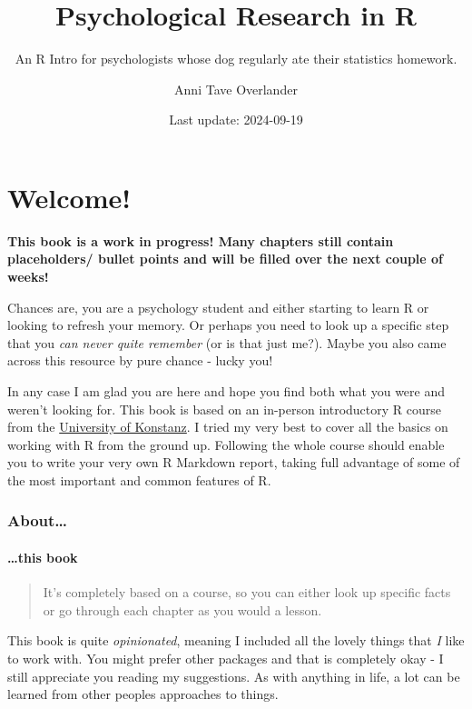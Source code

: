 \documentclass[
]{book}
\title{Psychological Research in R}
\subtitle{An R Intro for psychologists whose dog regularly ate their statistics homework.}
\author{Anni Tave Overlander}
\date{Last update: 2024-09-19}
\begin{document}
\maketitle

{
\setcounter{tocdepth}{1}
\tableofcontents
}
\chapter*{Welcome!}\label{welcome}

\textbf{This book is a work in progress! Many chapters still contain placeholders/ bullet points and will be filled over the next couple of weeks!}

Chances are, you are a psychology student and either starting to learn R or looking to refresh your memory.
Or perhaps you need to look up a specific step that you \emph{can never quite remember} (or is that just me?).
Maybe you also came across this resource by pure chance - lucky you!

In any case I am glad you are here and hope you find both what you were and weren't looking for.
This book is based on an in-person introductory R course from the \href{https://www.uni-konstanz.de/}{University of Konstanz}.
I tried my very best to cover all the basics on working with R from the ground up.
Following the whole course should enable you to write your very own R Markdown report, taking full advantage of some of the most important and common features of R.

\subsection*{About\ldots{}}\label{about}

\subsubsection*{\ldots this book}\label{this-book}

\begin{quote}
It's completely based on a course, so you can either look up specific facts or go through each chapter as you would a lesson.
\end{quote}

This book is quite \emph{opinionated}, meaning I included all the lovely things that \emph{I} like to work with.
You might prefer other packages and that is completely okay - I still appreciate you reading my suggestions.
As with anything in life, a lot can be learned from other peoples approaches to things.
\end{document}
